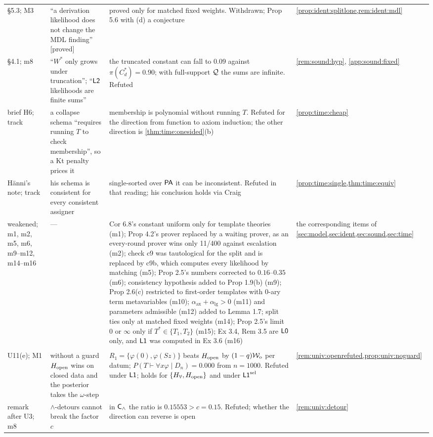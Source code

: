 {\begin{longtable}{@{}>{\raggedright\arraybackslash}p{1.9cm}>{\raggedright\arraybackslash}p{4.3cm}>{\raggedright\arraybackslash}p{6.1cm}>{\raggedright\arraybackslash}p{2.6cm}@{}}
\S5.3; M3 & ``a derivation likelihood does not change the MDL finding'' [proved] & proved only for matched fixed weights. Withdrawn; Prop 5.6 with (d) a conjecture & \cref{prop:ident:splitlone,rem:ident:mdl}\\
\S4.1; m8 & ``$W^*$ only grows under truncation''; ``$\mathord{\mathsf{L2}}$ likelihoods are finite sums'' & the truncated constant can fall to $0.09$ against $\pi(C^*_d)=0.90$; with full-support $\mathcal{Q}$ the sums are infinite. Refuted & \cref{rem:sound:hyp}, \cref{app:sound:fixed}\\
brief H6; track & a collapse schema ``requires running $T$ to check membership'', so a Kt penalty prices it & membership is polynomial without running $T$. Refuted for the direction from function to axiom induction; the other direction is \cref{thm:time:onesided}(b) & \cref{prop:time:cheap}\\
H\"anni's note; track & his schema is consistent for every consistent assigner & single-sorted over $\mathsf{PA}$ it can be inconsistent. Refuted in that reading; his conclusion holds via Craig & \cref{prop:time:single,thm:time:equiv}\\
weakened; m1, m2, m5, m6, m9--m12, m14--m16 & --- & Cor 6.8's constant uniform only for template theories (m1); Prop 4.2's prover replaced by a waiting prover, as an every-round prover wins only 11/400 against escalation (m2); check c9 was tautological for the split and is replaced by c9b, which computes every likelihood by matching (m5); Prop 2.5's numbers corrected to $0.16$--$0.35$ (m6); consistency hypothesis added to Prop 1.9(b) (m9); Prop 2.6(c) restricted to first-order templates with $0$-ary term metavariables (m10); $\alpha_{\mathrm{ax}}+\alpha_{\mathrm{lg}}>0$ (m11) and parameters admissible (m12) added to Lemma 1.7; split ties only at matched fixed weights (m14); Prop 2.5's limit $0$ or $\infty$ only if $T^*\in\{T_1,T_2\}$ (m15); Ex 3.4, Rem 3.5 are $\mathord{\mathsf{L0}}$ only, and $\mathord{\mathsf{L1}}$ was computed in Ex 3.6 (m16) & the corresponding items of \cref{sec:model,sec:ident,sec:sound,sec:time}\\
\midrule
\multicolumn{4}{@{}l}{\emph{universal track}}\\
U11(e); M1 & without a guard $H_{\mathrm{open}}$ wins on closed data and the posterior takes the $\omega$-step & $R_1=\{\varphi(0),\varphi(Sz)\}$ beats $H_{\mathrm{open}}$ by $(1-q)\mathcal{W}_{\mathrm{o}}$ per datum; $P(T\vdash\forall x\varphi\mid D_n)=0.000$ from $n=1000$. Refuted under $\mathord{\mathsf{L1}}$; holds for $\{H_{\forall},H_{\mathrm{open}}\}$ and under $\mathord{\mathsf{L1}}^{\mathrm{sel}}$ & \cref{rem:univ:openrefuted,prop:univ:noguard}\\
remark after U3; m8 & $\wedge$-detours cannot break the factor $c$ & in $\mathsf{C}_{\wedge}$ the ratio is $0.15553>c=0.15$. Refuted; whether the direction can reverse is open & \cref{rem:univ:detour}\\

\end{longtable}}
